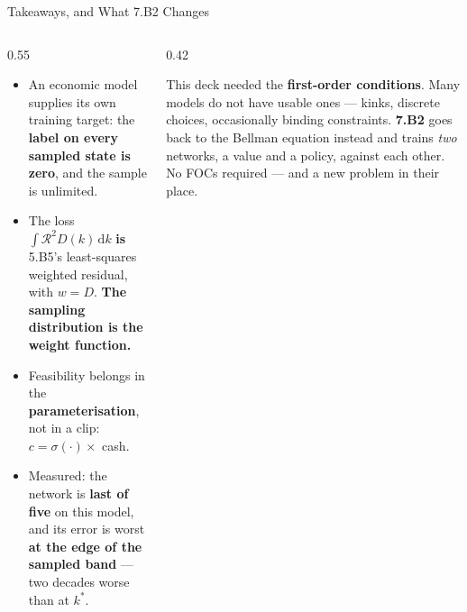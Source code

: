\begin{frame}{Takeaways, and What 7.B2 Changes}
\begin{columns}[T]
\begin{column}{0.55\textwidth}
\begin{takeawaybox}\small
\begin{itemize}\small\setlength{\itemsep}{1.1mm}
  \item An economic model supplies its own training target: the \textbf{label on every sampled state is zero}, and the sample is unlimited.
  \item The loss $\int\mathcal{R}^{2}D(k)\,\mathrm{d}k$ \textbf{is} 5.B5's least-squares weighted residual, with $w=D$. \textbf{The sampling distribution is the weight function.}
  \item Feasibility belongs in the \textbf{parameterisation}, not in a clip: $c=\sigma(\cdot)\times$ cash.
  \item Measured: the network is \textbf{last of five} on this model, and its error is worst \textbf{at the edge of the sampled band} --- two decades worse than at $k^{*}$.
\end{itemize}
\end{takeawaybox}
\end{column}
\begin{column}{0.42\textwidth}
\begin{conceptbox}[title=\textbf{Bridge to 7.B2}]\small
This deck needed the \textbf{first-order conditions}. Many models do not have usable ones --- kinks, discrete choices, occasionally binding constraints.
\medskip
\textbf{7.B2} goes back to the Bellman equation instead and trains \emph{two} networks, a value and a policy, against each other. No FOCs required --- and a new problem in their place.
\end{conceptbox}
\end{column}
\end{columns}
\end{frame}



